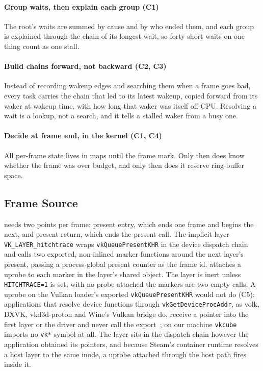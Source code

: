 \paragraph{Group waits, then explain each group (C1)}
The root's waits are summed by cause and by who ended them, and each group
is explained through the chain of its longest wait, so forty short waits on
one thing count as one stall.

\paragraph{Build chains forward, not backward (C2, C3)}
Instead of recording wakeup edges and searching them when a frame goes bad,
every task carries the chain that led to its latest wakeup, copied forward
from its waker at wakeup time, with how long that waker was itself off-CPU.
Resolving a wait is a lookup, not a search, and it tells a stalled waker
from a busy one.

\paragraph{Decide at frame end, in the kernel (C1, C4)}
All per-frame state lives in maps until the frame mark. Only then does \sys
know whether the frame was over budget, and only then does it reserve
ring-buffer space.

\subsection{Frame Source}
\label{sec:layer}

\sys needs two points per frame: present entry, which ends one frame and
begins the next, and present return, which ends the present call. The
implicit layer \texttt{VK\_LAYER\_hitchtrace} wraps
\texttt{vkQueuePresentKHR} in the device dispatch chain and calls two
exported, non-inlined marker functions around the next layer's present,
passing a process-global present counter as the frame id. \sys attaches a
uprobe to each marker in the layer's shared object. The layer is inert
unless \texttt{HITCHTRACE=1} is set; with no probe attached the markers are
two empty calls. A uprobe on the Vulkan loader's exported
\texttt{vkQueuePresentKHR} would not do (C5): applications that resolve
device functions through \texttt{vkGetDeviceProcAddr}, as volk, DXVK,
vkd3d-proton and Wine's Vulkan bridge do, receive a pointer into the first
layer or the driver and never call the export~\cite{vulkan-loader}; on our
machine \texttt{vkcube} imports no \texttt{vk*} symbol at all. The layer
sits in the dispatch chain however the application obtained its pointers,
and because Steam's container runtime resolves a host layer to the same
inode, a uprobe attached through the host path fires inside it.

